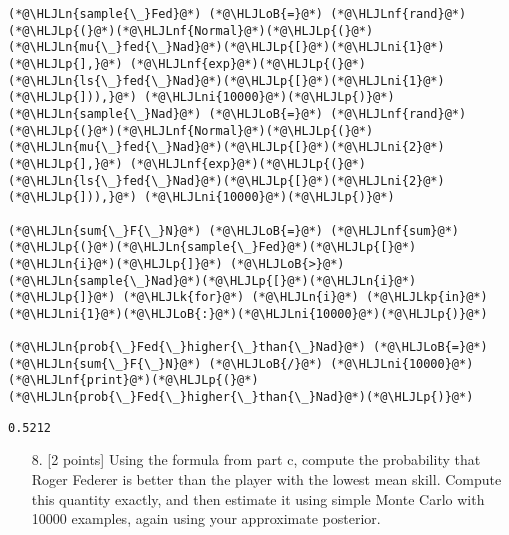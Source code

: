 \documentclass[12pt,a4paper]{article}
\newcommand{\HLJLk}[1]{\textcolor[RGB]{148,91,176}{\textbf{#1}}}
\newcommand{\HLJLkp}[1]{\textcolor[RGB]{148,91,176}{\textbf{#1}}}
\newcommand{\HLJLn}[1]{#1}
\newcommand{\HLJLnf}[1]{\textcolor[RGB]{66,102,213}{#1}}
\newcommand{\HLJLni}[1]{\textcolor[RGB]{59,151,46}{#1}}
\newcommand{\HLJLoB}[1]{\textcolor[RGB]{102,102,102}{\textbf{#1}}}
\newcommand{\HLJLp}[1]{#1}
\begin{document}
\begin{lstlisting}
(*@\HLJLn{sample{\_}Fed}@*) (*@\HLJLoB{=}@*) (*@\HLJLnf{rand}@*)(*@\HLJLp{(}@*)(*@\HLJLnf{Normal}@*)(*@\HLJLp{(}@*)(*@\HLJLn{mu{\_}fed{\_}Nad}@*)(*@\HLJLp{[}@*)(*@\HLJLni{1}@*)(*@\HLJLp{],}@*) (*@\HLJLnf{exp}@*)(*@\HLJLp{(}@*)(*@\HLJLn{ls{\_}fed{\_}Nad}@*)(*@\HLJLp{[}@*)(*@\HLJLni{1}@*)(*@\HLJLp{])),}@*) (*@\HLJLni{10000}@*)(*@\HLJLp{)}@*)
(*@\HLJLn{sample{\_}Nad}@*) (*@\HLJLoB{=}@*) (*@\HLJLnf{rand}@*)(*@\HLJLp{(}@*)(*@\HLJLnf{Normal}@*)(*@\HLJLp{(}@*)(*@\HLJLn{mu{\_}fed{\_}Nad}@*)(*@\HLJLp{[}@*)(*@\HLJLni{2}@*)(*@\HLJLp{],}@*) (*@\HLJLnf{exp}@*)(*@\HLJLp{(}@*)(*@\HLJLn{ls{\_}fed{\_}Nad}@*)(*@\HLJLp{[}@*)(*@\HLJLni{2}@*)(*@\HLJLp{])),}@*) (*@\HLJLni{10000}@*)(*@\HLJLp{)}@*)

(*@\HLJLn{sum{\_}F{\_}N}@*) (*@\HLJLoB{=}@*) (*@\HLJLnf{sum}@*)(*@\HLJLp{(}@*)(*@\HLJLn{sample{\_}Fed}@*)(*@\HLJLp{[}@*)(*@\HLJLn{i}@*)(*@\HLJLp{]}@*) (*@\HLJLoB{>}@*) (*@\HLJLn{sample{\_}Nad}@*)(*@\HLJLp{[}@*)(*@\HLJLn{i}@*)(*@\HLJLp{]}@*) (*@\HLJLk{for}@*) (*@\HLJLn{i}@*) (*@\HLJLkp{in}@*) (*@\HLJLni{1}@*)(*@\HLJLoB{:}@*)(*@\HLJLni{10000}@*)(*@\HLJLp{)}@*)

(*@\HLJLn{prob{\_}Fed{\_}higher{\_}than{\_}Nad}@*) (*@\HLJLoB{=}@*) (*@\HLJLn{sum{\_}F{\_}N}@*) (*@\HLJLoB{/}@*) (*@\HLJLni{10000}@*)
(*@\HLJLnf{print}@*)(*@\HLJLp{(}@*)(*@\HLJLn{prob{\_}Fed{\_}higher{\_}than{\_}Nad}@*)(*@\HLJLp{)}@*)
\end{lstlisting}

\begin{lstlisting}
0.5212
\end{lstlisting}


\begin{itemize}
\item[8. ] [2 points] Using the formula from part c, compute the probability that Roger Federer is better than the player with the lowest mean skill. Compute this quantity exactly, and then estimate it using simple Monte Carlo with 10000 examples, again using your approximate posterior.

\end{itemize}
\end{document}
